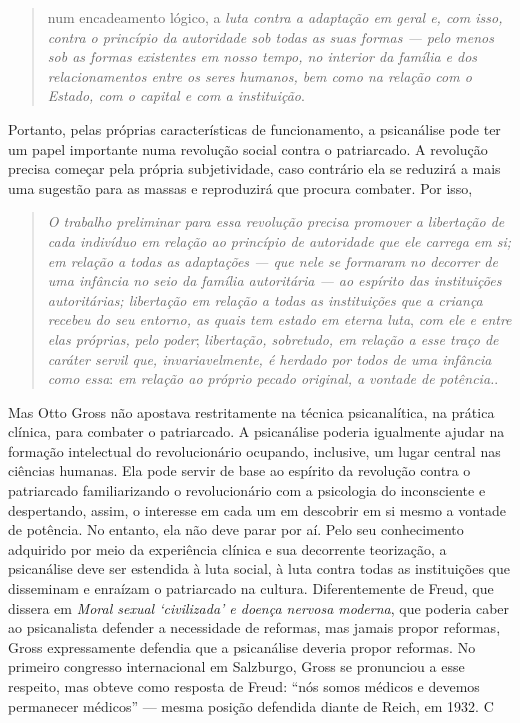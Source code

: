 \begin{quote}
num encadeamento lógico, a \emph{luta contra a adaptação em geral e, com
isso, contra o princípio da autoridade sob todas as suas formas --- pelo
menos sob as formas existentes em nosso tempo, no interior da família e
dos relacionamentos entre os seres humanos, bem como na relação com o
Estado, com o capital e com a instituição}.
\end{quote}

Portanto, pelas próprias características de funcionamento, a psicanálise
pode ter um papel importante numa revolução social contra o patriarcado.
A revolução precisa começar pela própria subjetividade, caso contrário
ela se reduzirá a mais uma sugestão para as massas e reproduzirá que
procura combater. Por isso,

\begin{quote}
\emph{O trabalho preliminar para essa revolução precisa promover a
libertação de cada indivíduo em relação ao princípio de autoridade que
ele carrega em si; em relação a todas as adaptações --- que nele se
formaram no decorrer de uma infância no seio da família autoritária ---
ao espírito das instituições autoritárias; libertação em relação a todas
as instituições que a criança recebeu do seu entorno, as quais tem
estado em eterna luta}, \emph{com ele e entre elas próprias, pelo
poder}; \emph{libertação, sobretudo, em relação a esse traço de caráter
servil que, invariavelmente, é herdado por todos de uma infância como
essa}: \emph{em relação ao próprio pecado original, a vontade de
potência.}.
\end{quote}

Mas Otto Gross não apostava restritamente na técnica psicanalítica, na
prática clínica, para combater o patriarcado. A psicanálise poderia
igualmente ajudar na formação intelectual do revolucionário ocupando,
inclusive, um lugar central nas ciências humanas. Ela pode servir de
base ao espírito da revolução contra o patriarcado familiarizando o
revolucionário com a psicologia do inconsciente e despertando, assim, o
interesse em cada um em descobrir em si mesmo a vontade de potência. No
entanto, ela não deve parar por aí. Pelo seu conhecimento adquirido por
meio da experiência clínica e sua decorrente teorização, a psicanálise
deve ser estendida à luta social, à luta contra todas as instituições
que disseminam e enraízam o patriarcado na cultura. Diferentemente de
Freud, que dissera em \emph{Moral sexual `civilizada' e doença nervosa
moderna}, que poderia caber ao psicanalista defender a necessidade de
reformas, mas jamais propor reformas, Gross expressamente defendia que a
psicanálise deveria propor reformas. No primeiro congresso internacional
em Salzburgo, Gross se pronunciou a esse respeito, mas obteve como
resposta de Freud: ``nós somos médicos e devemos permanecer médicos'' ---
mesma posição defendida diante de Reich, em 1932. C

